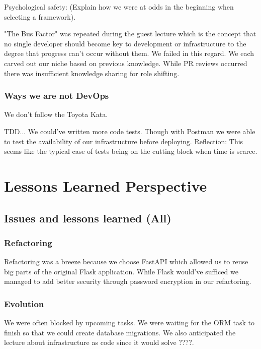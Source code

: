 \documentclass{article}
\begin{document}
Psychological safety: (Explain how we were at odds in the beginning when selecting a framework). 

"The Bus Factor" was repeated during the guest lecture which is the concept that no single developer should become key to development or infrastructure to the degree that progress can't occur without them. We failed in this regard. We each carved out our niche based on previous knowledge. While PR reviews occurred there was insufficient knowledge sharing for role shifting. 

\subsubsection{Ways we are not DevOps}

We don't follow the Toyota Kata. 

TDD... We could've written more code tests. Though with Postman we were able to test the availability of our infrastructure before deploying. Reflection: This seems like the typical case of tests being on the cutting block when time is scarce. 


\section{Lessons Learned Perspective}

\subsection{Issues and lessons learned (All)}


\subsubsection{Refactoring} 

Refactoring was a breeze because we choose FastAPI which allowed us to reuse big parts of the original Flask application. While Flask would've sufficed we managed to add better security through password encryption in our refactoring. 

\subsubsection{Evolution}

We were often blocked by upcoming tasks. We were waiting for the ORM task to finish so that we could create database migrations. We also anticipated the lecture about infrastructure as code since it would solve ????.
\end{document}
